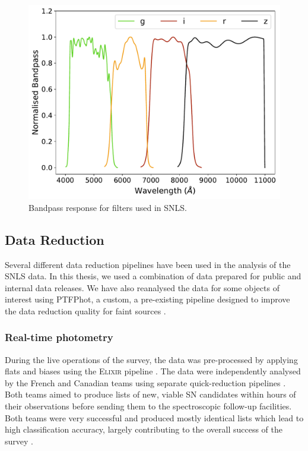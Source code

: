 \begin{figure}
  \centering
  \includegraphics[width=\textwidth]{Figures/Chapter2/SNLS_filters.pdf}
    \caption{Bandpass response for filters used in SNLS.}
    \label{fig:SNLSFilters}
\end{figure}

\subsection{Data Reduction}
Several different data reduction pipelines have been used in the analysis of the SNLS data. In this thesis, we used a combination of data prepared for public and internal data releases. We have also reanalysed the data for some objects of interest using PTFPhot, a custom, a pre-existing pipeline designed to improve the data reduction quality for faint sources \citep{Firth2015}.

\subsubsection{Real-time photometry}
During the live operations of the survey, the data was pre-processed by applying flats and biases using the \textsc{Elixir} pipeline \citep{Magnier2004}. The data were independently analysed by the French and Canadian teams using separate quick-reduction pipelines \citep{Astier2006,Bazin2011}. Both teams aimed to produce lists of new, viable SN candidates within hours of their observations before sending them to the spectroscopic follow-up facilities. Both teams were very successful and produced mostly identical lists which lead to high classification accuracy, largely contributing to the overall success of the survey \citep{Pritchet2004}.

